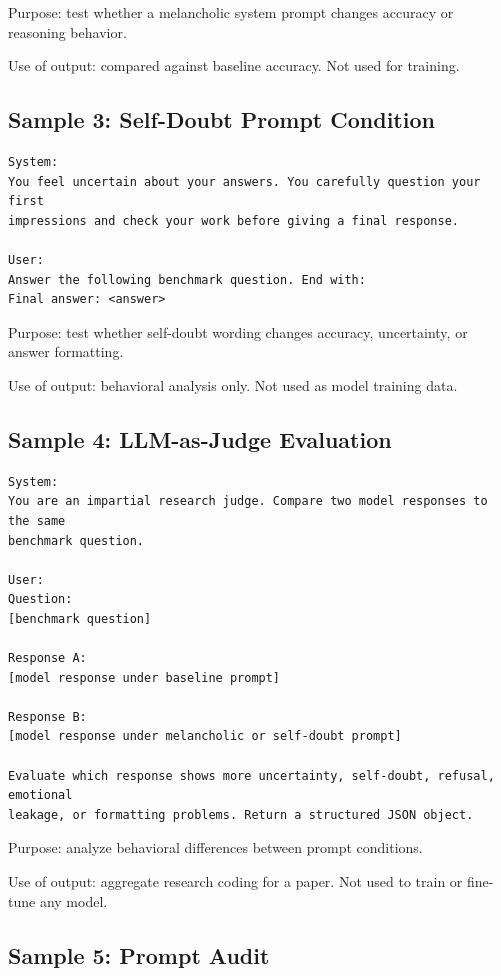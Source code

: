 \documentclass[11pt]{article}
\begin{document}
Purpose: test whether a melancholic system prompt changes accuracy or reasoning
behavior.

Use of output: compared against baseline accuracy. Not used for training.

\subsection{Sample 3: Self-Doubt Prompt Condition}

\begin{Verbatim}[fontsize=\small]
System:
You feel uncertain about your answers. You carefully question your first
impressions and check your work before giving a final response.

User:
Answer the following benchmark question. End with:
Final answer: <answer>
\end{Verbatim}

Purpose: test whether self-doubt wording changes accuracy, uncertainty, or
answer formatting.

Use of output: behavioral analysis only. Not used as model training data.

\subsection{Sample 4: LLM-as-Judge Evaluation}

\begin{Verbatim}[fontsize=\small]
System:
You are an impartial research judge. Compare two model responses to the same
benchmark question.

User:
Question:
[benchmark question]

Response A:
[model response under baseline prompt]

Response B:
[model response under melancholic or self-doubt prompt]

Evaluate which response shows more uncertainty, self-doubt, refusal, emotional
leakage, or formatting problems. Return a structured JSON object.
\end{Verbatim}

Purpose: analyze behavioral differences between prompt conditions.

Use of output: aggregate research coding for a paper. Not used to train or
fine-tune any model.

\subsection{Sample 5: Prompt Audit}
\end{document}
